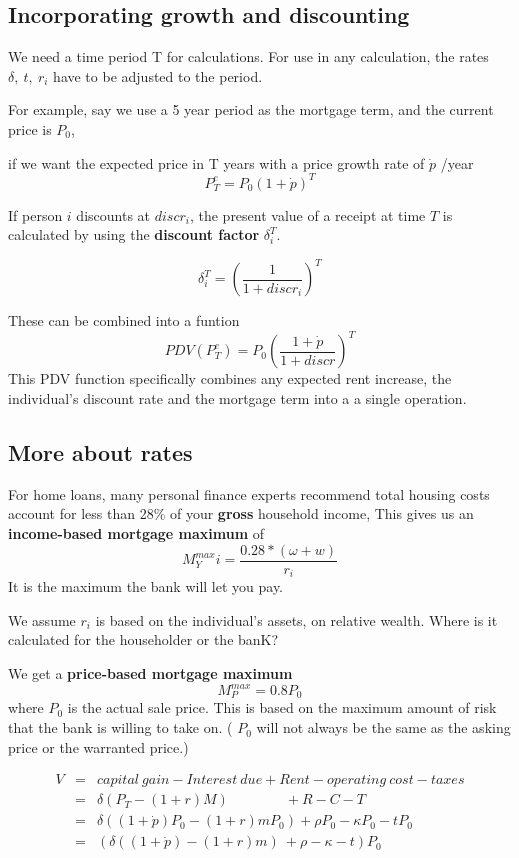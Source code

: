 \subsection{Incorporating growth and discounting}
We need a time period T for calculations. For use in any calculation, the rates $\delta,\ t,\ r_i$ have to be adjusted to the period.

For example, say we use  a 5 year period as the mortgage term, and the current price is $P_0$,

if we want the expected price in  T years   with a price growth rate of $\dot p$ /year 
\[P^e_T=P_0(1+\dot p)^T\]

If person $i$  discounts at $discr_i$, the present value of  a receipt at time $T$ is calculated by using the \textbf{discount factor} $\delta_i^T$.

\[\delta_i^T= \left( \frac{1}{1+discr_i} \right)^T \]
 
These can be combined into a funtion %
\[ PDV(P^e_T)=P_0\left( \frac{1+\dot p}{1+discr} \right)^T \]
This PDV function specifically combines any expected rent increase, the individual's discount rate and the mortgage term into a a single operation. 




\subsection{More about rates}

For home loans, many personal finance experts recommend total housing costs account for less than 28\% of your \textbf{gross} household income, This gives us an \textbf{income-based  mortgage maximum} of \[M^{max}_Yi = \frac{0.28*(\omega+w)}{r_i}\] It is the maximum the bank will let you pay.

We assume $r_i$ is based on the individual's assets, on relative wealth. Where is it calculated for the householder or the banK?

We get a \textbf{price-based mortgage maximum} \[M^{max}_P = 0.8P_0\] where $P_0$ is the actual sale price. This is based on the maximum amount of risk that the bank is willing to take on. ( $P_0$  will not always be the same as the asking price or the warranted price.) 


\begin{eqnarray}
V  	&=& capital\ gain - Interest\ due  	+ Rent  - operating\ cost -taxes\\
&=& \delta(P_T- (1+r)M) \qquad \qquad 	 + R  	-C   - T\label{B2}\\
&=& \delta((1+\dot p)  P_0- (1+r)mP_0)   + \rho P_0  	-\kappa P_0 - tP_0\\
&=&( \delta((1+\dot p)  - (1+r)m) \ + \rho   	-\kappa -t) P_0
\end{eqnarray}

